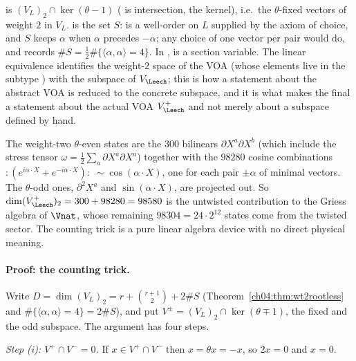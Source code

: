 \begin{dictionary}
 is $(V_L)_2\cap\ker(\theta-1)$ ( is intersection,  the
kernel), i.e.\ the $\theta$-fixed vectors of weight $2$ in $V_L$.  is the set
$S$:  is a well-order on $L$ supplied by the axiom of choice, and $S$ keeps
$\alpha$ when $\alpha$ precedes $-\alpha$; any choice of one vector per pair would do, and
 records $\#S=\tfrac12\#\{\langle\alpha,\alpha\rangle=4\}$. In
,  is a section variable. The linear equivalence
 identifies the weight-$2$ space of the VOA 
(whose elements live in the subtype ) with the subspace  of
$V_\Leech$; this is how a statement about the abstract VOA is reduced to the concrete subspace, and
it is what makes the final  a statement about the actual
VOA $V_\Leech^+$ and not merely about a subspace defined by hand.
\end{dictionary}

\begin{physics}
The weight-two $\theta$-even states are the $300$ bilinears $\partial X^a\partial X^b$ (which include the stress tensor $\omega=\tfrac12\sum_a\partial X^a\partial X^a$) together with the $98280$ cosine combinations $:\!(e^{i\alpha\cdot X}+e^{-i\alpha\cdot X})\!:\;\sim\cos(\alpha\cdot X)$, one for each pair $\pm\alpha$ of minimal vectors. The $\theta$-odd ones, $\partial^2X^a$ and $\sin(\alpha\cdot X)$, are projected out. So $\dim(V_\Leech^+)_2=300+98280=98580$ is the untwisted contribution to the Griess algebra of $\Vnat$, whose remaining $98304=24\cdot2^{12}$ states come from the twisted sector. The counting trick is a pure linear algebra device with no direct physical meaning.
\end{physics}

\paragraph{Proof: the counting trick.} Write $D=\dim(V_L)_2=r+\binom{r+1}2+2\#S$
(Theorem~\ref{ch04:thm:wt2rootless} and $\#\{\langle\alpha,\alpha\rangle=4\}=2\#S$), and put
$V^\pm=(V_L)_2\cap\ker(\theta\mp1)$, the fixed and the odd subspace. The argument has four steps.

\emph{Step (i): $V^+\cap V^-=0$.} If $x\in V^+\cap V^-$ then $x=\theta x=-x$, so $2x=0$ and $x=0$.

